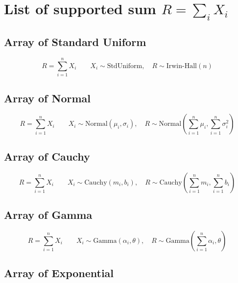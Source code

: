 
\section{List of supported sum $R = \sum_i X_i$}
\subsection{Array of Standard Uniform}
    \begin{equation}
        R = \sum_{i=1}^n X_i \qquad 
        X_i \sim \text{StdUniform}, \quad 
        R \sim \text{Irwin-Hall}(n)
    \end{equation}

\subsection{Array of Normal}
    \begin{equation}
        R = \sum_{i=1}^n X_i \qquad 
        X_i \sim \text{Normal}(\mu_i,\sigma_i), \quad 
        R \sim \text{Normal}\left(\sum _{i=1}^{n}\mu _{i},\sum _{i=1}^{n}\sigma _{i}^{2}\right)
    \end{equation}

\subsection{Array of Cauchy}

    \begin{equation}
        R = \sum_{i=1}^n X_i \qquad 
        X_i \sim \text{Cauchy}(m_i,b_i), \quad 
        R \sim \text{Cauchy}\left(\sum _{i=1}^{n}m_{i},\sum _{i=1}^{n}b _{i}\right)
    \end{equation}

\subsection{Array of Gamma}

    \begin{equation}
        R = \sum_{i=1}^n X_i \qquad 
        X_i \sim \text{Gamma}(\alpha_i,\theta), \quad 
        R \sim \text{Gamma}\left(\sum _{i=1}^{n}\alpha_{i},\theta \right)
    \end{equation}

\subsection{Array of Exponential}

